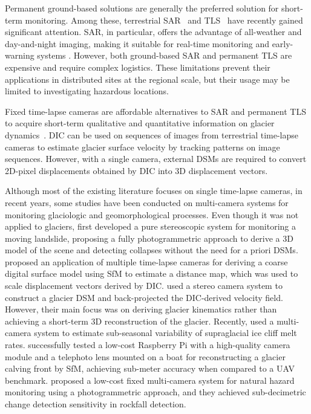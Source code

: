 Permanent ground-based solutions are generally the preferred solution for short-term monitoring.
Among these, terrestrial SAR~\citep{Strozzi2020} and TLS~\citep{Hendrickx2022,Voordendag2023} have recently gained significant attention.
SAR, in particular, offers the advantage of all-weather and day-and-night imaging, making it suitable for real-time monitoring and early-warning systems \citep{Dematteis2021, Noferini2009}.
However, both ground-based SAR and permanent TLS are expensive and require complex logistics.
These limitations prevent their applications in distributed sites at the regional scale, but their usage may be limited to investigating hazardous locations.

Fixed time-lapse cameras are affordable alternatives to SAR and permanent TLS to acquire short-term qualitative and quantitative information on glacier dynamics~\citep{Giordan2016, James2016, Maas2006, Messerli2015}.
DIC can be used on sequences of images from terrestrial time-lapse cameras to estimate glacier surface velocity by tracking patterns on image sequences.
However, with a single camera, external DSMs are required to convert 2D-pixel displacements obtained by DIC into 3D displacement vectors.

Although most of the existing literature focuses on single time-lapse cameras, in recent years, some studies have been conducted on multi-camera systems for monitoring glaciologic and geomorphological processes.
Even though it was not applied to glaciers, \citet{roncella_landslide_2014} first developed a pure stereoscopic system for monitoring a moving landslide, proposing a fully photogrammetric approach to derive a 3D model of the scene and detecting collapses without the need for a priori DSMs.
\citet{Schwalbe2017} proposed an application of multiple time-lapse cameras for deriving a coarse digital surface model using SfM to estimate a distance
map, which was used to scale displacement vectors derived by DIC.
\citet{Marsy2020} used a stereo camera system to construct a glacier DSM and back-projected the DIC-derived velocity field.
However, their main focus was on deriving glacier kinematics rather than achieving a short-term 3D reconstruction of the glacier.
Recently, \citet{kneib_sub-seasonal_2022} used a multi-camera system to estimate sub-seasonal variability of supraglacial ice cliff melt rates.
\citet{Taylor2023} successfully tested a low-cost Raspberry Pi with a high-quality camera module and a telephoto lens mounted on a boat for reconstructing a glacier calving front by SfM, achieving sub-meter accuracy when compared to a UAV benchmark.
\citet{Blanch2023} proposed a low-cost fixed multi-camera system for natural hazard monitoring using a photogrammetric approach, and they achieved sub-decimetric change
detection sensitivity in rockfall detection.

